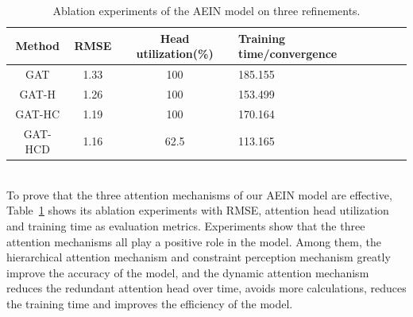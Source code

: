 \begin{table}[htbp] 
  \centering  
  \caption{Ablation experiments of the AEIN model on three refinements.}  
  \begin{tabular}{ccclll}  
    \toprule
    Method& RMSE& Head utilization(\%)& Training time/convergence\\ 
    \midrule
    GAT& 1.33& 100& 185.155\\  
    GAT-H& 1.26& 100& 153.499\\  
    GAT-HC& 1.19& 100& 170.164\\
    \centering  
    GAT-HCD& 1.16& 62.5& 113.165\\  
    \bottomrule
  \end{tabular}
  \label{tab3}  
\end{table}\\

To prove that the three attention mechanisms of our AEIN model are effective, Table~\ref{tab3} shows its ablation experiments with 
RMSE, attention head utilization and training time as evaluation metrics. Experiments show that the three attention mechanisms all 
play a positive role in the model. Among them, the hierarchical attention mechanism and constraint perception mechanism greatly 
improve the accuracy of the model, and the dynamic attention mechanism reduces the redundant attention head over time, avoids more 
calculations, reduces the training time and improves the efficiency of the model.
